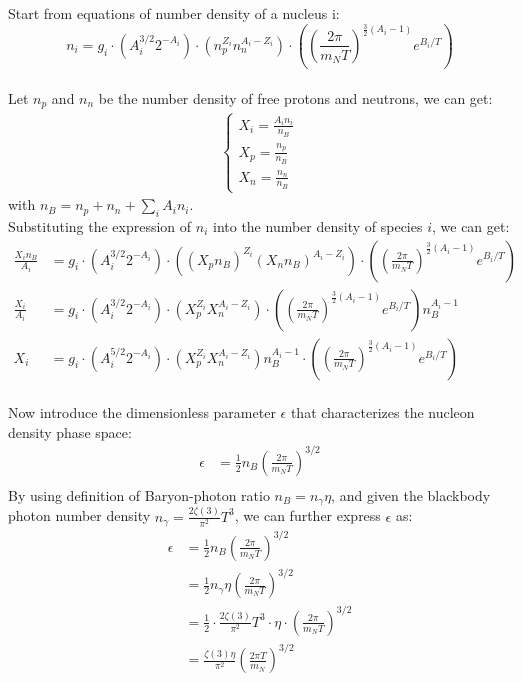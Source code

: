\bigskip \noindent
\begin{foundation}
    Start from equations of number density of a nucleus i:
    \[
        n_i = g_i \cdot \left(A_i^{3/2} 2^{-A_i}\right) \cdot  \left(n_p^{Z_i} n_n^{A_i - Z_i}\right) \cdot \left( (\frac{2\pi}{m_N T})^{\frac{3}{2}(A_i - 1)} e^{B_i / T} \right)
    \] \\

    Let $n_p$ and $n_n$ be the number density of free protons and neutrons, we can get:
    \begin{align*}
        \begin{cases}
            X_i = \frac{A_i n_i}{n_B} \\
            X_p = \frac{n_p}{n_B} \\
            X_n = \frac{n_n}{n_B}
        \end{cases}
    \end{align*}
    with $n_B = n_p + n_n + \sum_i A_i n_i$.\\

    Substituting the expression of $n_i$ into the number density of species $i$, we can get:
    \begin{align*}
        \frac{X_i n_B}{A_i} &= g_i \cdot \left(A_i^{3/2} 2^{-A_i}\right) \cdot  \left((X_p n_B)^{Z_i} (X_n n_B)^{A_i - Z_i}\right) \cdot \left( (\frac{2\pi}{m_N T})^{\frac{3}{2}(A_i - 1)} e^{B_i / T} \right) \\
        \frac{X_i}{A_i} &= g_i \cdot \left(A_i^{3/2} 2^{-A_i}\right) \cdot  \left(X_p^{Z_i} X_n^{A_i - Z_i}\right) \cdot \left( (\frac{2\pi}{m_N T})^{\frac{3}{2}(A_i - 1)} e^{B_i / T} \right) n_B^{A_i - 1} \\
        X_i &= g_i \cdot \left(A_i^{5/2} 2^{-A_i}\right) \cdot  \left(X_p^{Z_i} X_n^{A_i - Z_i}\right) n_B^{A_i - 1} \cdot \left( (\frac{2\pi}{m_N T})^{\frac{3}{2}(A_i - 1)} e^{B_i / T} \right) 
    \end{align*} \\

    Now introduce the dimensionless parameter $\epsilon$ that characterizes the nucleon density phase space:
    \begin{align*}
        \epsilon &= \frac{1}{2} n_B \left( \frac{2\pi}{m_N T} \right)^{3/2} \\
    \end{align*}
    By using definition of Baryon-photon ratio $n_B = n_\gamma \eta$, and given the blackbody photon number density $n_\gamma = \frac{2\zeta(3)}{\pi^2} T^3$, we can further express $\epsilon$ as:
    \begin{align*}
        \epsilon &= \frac{1}{2} n_B \left( \frac{2\pi}{m_N T} \right)^{3/2} \\
        &= \frac{1}{2} n_\gamma \eta \left( \frac{2\pi}{m_N T} \right)^{3/2} \\
        &= \frac{1}{2} \cdot \frac{2\zeta(3)}{\pi^2} T^3 \cdot \eta \cdot \left( \frac{2\pi}{m_N T} \right)^{3/2} \\
        &= \frac{\zeta(3) \eta}{\pi^2} \left( \frac{2\pi T}{m_N} \right)^{3/2} 
    \end{align*} \\


\end{foundation}
